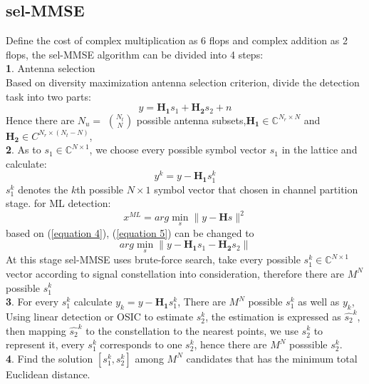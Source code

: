 \documentclass[12pt,a4paper,final]{article}
\begin{document}
\begin{spacing}{2.5}
\subsection{sel-MMSE}\label{sel-MMSE}
Define the cost of complex multiplication as 6 flops and complex addition as 2 flops, the sel-MMSE algorithm can be divided into 4 steps\cite{2}:\\
\textbf{1}. Antenna selection\\
Based on diversity maximization antenna selection criterion, divide the detection task into two parts:
\begin{equation}
y=\mathbf{H_{1}}s_{1}+\mathbf{H_{2}}s_{2}+n\label{equation 4}
\end{equation}
Hence there are $N_{u}=$ $N_{t}\choose N$ possible antenna subsets,$\mathbf{H_{1}}\in \mathbb{C}^{N_{r}\times N}$ and $\mathbf{H_{2}}\in C^{N_{r}\times (N_{t}-N)}$,\\
\textbf{2}. As to $s_{1}\in \mathbb{C}^{N\times 1}$, we choose every possible symbol vector $s_{1}$ in the lattice and calculate:
\begin{equation}
y^{k}=y-\mathbf{H_{1}}s_{1}^{k}   \label{equation41}
\end{equation}
$s_{1}^{k}$ denotes the $k$th possible $N\times 1$ symbol vector that chosen in channel partition stage.
for ML detection:
\begin{equation}
x^{ML}=arg\min_{s}\parallel y-\mathbf{H}s \parallel^{2}\label{equation 5}
\end{equation}
based on (\ref{equation 4}), (\ref{equation 5}) can be changed to
\begin{equation}
arg\min_{s}\parallel y-\mathbf{H_{1}}s_{1}-\mathbf{H_{2}}s_{2} \parallel
\end{equation} 
At this stage sel-MMSE uses brute-force search, take every possible $s_{1}^{k}\in \mathbb{C}^{N\times 1}$ vector according to signal constellation into consideration, therefore there are $M^N$ possible $s_{1}^{k}$ \\
\textbf{3}. For every $s_{1}^{k}$ calculate $y_{k}=y-\mathbf{H_{1}}s_{1}^{k}$, There are $M^{N}$ possible $s_{1}^{k}$ as well as $y_{k}$, Using linear detection or OSIC to estimate $s_{2}^{k}$, the estimation is expressed as $\hat{s_{2}}^{k}$, then mapping $\hat{s_{2}}^{k}$ to the constellation to the nearest points, we use $s_{2}^{k}$ to represent it, every $s_{1}^{k}$ corresponds to one $s_{2}^{k}$, hence there are $M^{N}$ posssible $s_{2}^{k}$.\\
\textbf{4}. Find the solution $[s_{1}^{k},s_{2}^{k}]$ among $M^{N}$ candidates that has the minimum total Euclidean distance.\\

\end{spacing}
\end{document}
